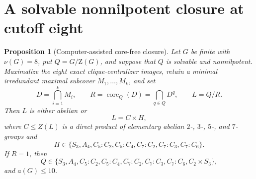 \documentclass[11pt]{article}
\newtheorem{proposition}[theorem]{Proposition}
\theoremstyle{remark}
\newcommand{\nuG}{\nu}
\newcommand{\aG}{a}
\newcommand{\Z}{\mathrm Z}
\begin{document}
\section{A solvable nonnilpotent closure at cutoff eight}

\begin{proposition}[Computer-assisted core-free closure]
\label{prop:nonnilpotent-core}
Let $G$ be finite with $\nuG(G)=8$, put $Q=G/\Z(G)$, and suppose that $Q$
is solvable and nonnilpotent.  Maximalize the eight exact
clique-centralizer images, retain a minimal irredundant maximal subcover
$M_1,\ldots,M_k$, and set
\[
 D=\bigcap_{i=1}^kM_i,
 \qquad R=\operatorname{core}_Q(D)=\bigcap_{q\in Q}D^q,
 \qquad L=Q/R.
\]
Then $L$ is either abelian or
\[
 L=C\times H,
\]
where $C\le Z(L)$ is a direct product of elementary abelian
$2$-, $3$-, $5$-, and $7$-groups and
\[
 H\in\{S_3,A_4,C_5{:}C_2,C_5{:}C_4,
        C_7{:}C_2,C_7{:}C_3,C_7{:}C_6\}.
\]
If $R=1$, then
\[
 Q\in\{S_3,A_4,C_5{:}C_2,C_5{:}C_4,C_7{:}C_2,C_7{:}C_3,
        C_7{:}C_6,C_2\times S_3\},
\]
and $\aG(G)\le10$.
\end{proposition}
\end{document}

